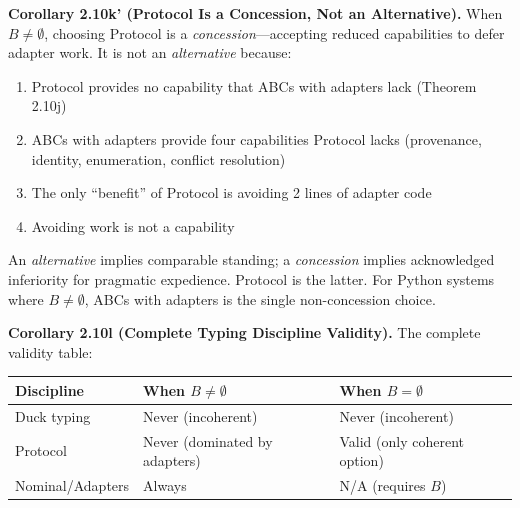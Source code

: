 \textbf{Corollary 2.10k' (Protocol Is a Concession, Not an Alternative).}
When \(B \neq \emptyset\), choosing Protocol is a \emph{concession}---accepting
reduced capabilities to defer adapter work. It is not an \emph{alternative}
because:
\begin{enumerate}
\def\labelenumi{\arabic{enumi}.}
\tightlist
\item Protocol provides no capability that ABCs with adapters lack (Theorem 2.10j)
\item ABCs with adapters provide four capabilities Protocol lacks (provenance, identity, enumeration, conflict resolution)
\item The only ``benefit'' of Protocol is avoiding 2 lines of adapter code
\item Avoiding work is not a capability
\end{enumerate}
An \emph{alternative} implies comparable standing; a \emph{concession} implies
acknowledged inferiority for pragmatic expedience. Protocol is the latter.
For Python systems where \(B \neq \emptyset\), ABCs with adapters is the single
non-concession choice.

\textbf{Corollary 2.10l (Complete Typing Discipline Validity).} The
complete validity table:

\small
\begin{longtable}[]{@{}
  >{\raggedright\arraybackslash}p{}
  >{\raggedright\arraybackslash}p{}
  >{\raggedright\arraybackslash}p{}@{}}
\toprule\noalign{}
\begin{minipage}[b]{\linewidth}\raggedright
Discipline
\end{minipage} & \begin{minipage}[b]{\linewidth}\raggedright
When \(B \neq \emptyset\)
\end{minipage} & \begin{minipage}[b]{\linewidth}\raggedright
When \(B = \emptyset\)
\end{minipage} \\
\midrule\noalign{}
\endhead
\bottomrule\noalign{}
\endlastfoot
Duck typing & Never (incoherent) & Never (incoherent) \\
Protocol & Never (dominated by adapters) & Valid (only coherent
option) \\
Nominal/Adapters & Always & N/A (requires \(B\)) \\
\end{longtable}

